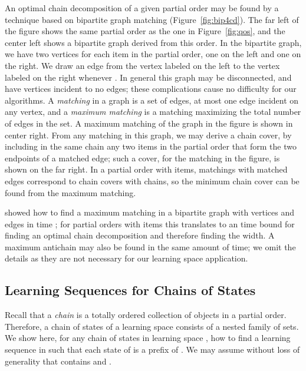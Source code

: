 \documentclass[11pt]{llncs}
\begin{document}
{An optimal chain decomposition of a given partial order may be found by a technique based on bipartite graph matching (Figure~\ref{fig:bip4cd}).
The far left of the figure shows the same partial order as the one in Figure~\ref{fig:qos}, and the center left shows a bipartite graph derived from this order. In the bipartite graph, we have two vertices for each item in the partial order, one on the left and one on the right. We draw an edge from the vertex labeled  on the left to the vertex labeled  on the right whenever . In general this graph may be disconnected, and have vertices incident to no edges; these complications cause no difficulty for our algorithms.
A \emph{matching} in a graph is a set of edges, at most one edge incident on any vertex, and a \emph{maximum matching} is a matching maximizing the total number of edges in the set.
A maximum matching of the graph in the figure is shown in center right.
From any matching in this graph, we may derive a chain cover, by including in the same chain any two items in the partial order that form the two endpoints of a matched edge; such a cover, for the matching in the figure, is shown on the far right. In a partial order with  items, matchings with  matched edges correspond to chain covers with  chains, so the minimum chain cover can be found from the maximum matching.

\citet{HopKar-SJC-73} showed how to find a maximum matching in a bipartite graph with  vertices and  edges in time ; for partial orders with  items this translates to an  time bound for finding an optimal chain decomposition and therefore finding the width. A maximum antichain may also be found in the same amount of time; we omit the details as they are not necessary for our learning space application.

\subsection{Learning Sequences for Chains of States}

Recall that a \emph{chain} is a totally ordered collection of objects in a partial order.
Therefore, a chain of states of a learning space consists of a nested family of sets.
We show here, for  any chain of states in learning space ,
how to find a learning sequence  in  such that each state of 
is a prefix of . We may assume without loss of generality that  contains  and .

}
\end{document}
